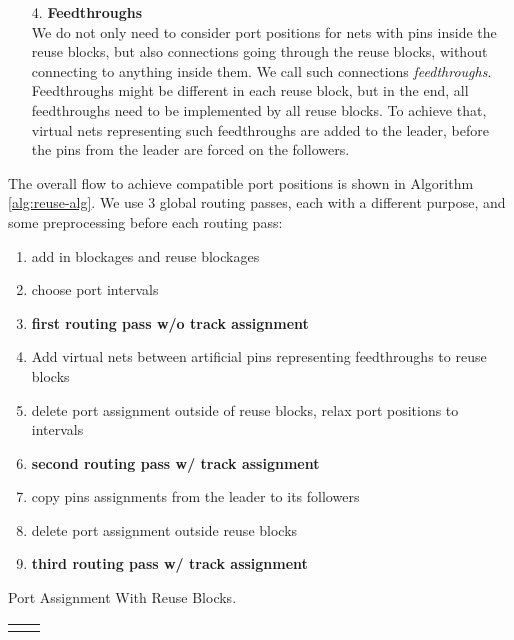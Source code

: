\documentclass[a2paper]{bigsposter}
\begin{document}
\begin{blockrow}
\begin{enumerate}
\item [{4.}] \textbf{Feedthroughs}\\
We do not only need to consider port positions for nets with pins inside the reuse blocks, but also connections going through the reuse blocks, without connecting to anything inside them. We call such connections \textit{feedthroughs}.
Feedthroughs might be different in each reuse block, but in the end, all feedthroughs need to be implemented by all reuse blocks. To achieve that, virtual nets representing such feedthroughs are added to the leader, before the pins from the leader are forced on the followers.
\end{enumerate}
\blockbreak
{}
The overall flow to achieve compatible port positions is shown in Algorithm \ref{alg:reuse-alg}.
We use 3 global routing passes, each with a different purpose, and some preprocessing before each routing pass:
\begin{algorithm}[H] 
	\begin{enumerate}
		\item add in blockages and reuse blockages \label{step:add-blockages}
		\item choose port intervals  \label{PIstep}
		\item \textbf{first routing pass w/o track assignment} \label{step:pass1}
		\item Add virtual nets between artificial pins representing feedthroughs to reuse blocks \label{step:create-artificial-feedthroughs}
		\item delete port assignment outside of reuse blocks, relax port positions to intervals \label{step:relaxpositions}
		\item \textbf{second routing pass w/ track assignment}
		\item copy pins assignments from the leader to its followers \label{step:copy-pin-assignment}
		\item delete port assignment outside reuse blocks
		\item \textbf{third routing pass w/ track assignment}
	\end{enumerate} %
	\caption{Port Assignment With Reuse Blocks.}
	\label{alg:reuse-alg}
\end{algorithm}
\begin{tabular}{cc}
	\begin{minipage}{0.5\blockwidth}


\end{minipage}
\end{tabular}
\end{blockrow}
\end{document}
